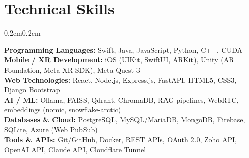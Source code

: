 \documentclass[9.5pt, letterpaper]{article}
\newenvironment{onecolentry}{
    \begin{adjustwidth}{0.2cm}{0.2cm}
}{
    \end{adjustwidth}
}
\begin{document}
\section{Technical Skills}
\begin{onecolentry}
\textbf{Programming Languages:} Swift, Java, JavaScript, Python, C++, CUDA \\
\textbf{Mobile / XR Development:} iOS (UIKit, SwiftUI, ARKit), Unity (AR Foundation, Meta XR SDK), Meta Quest 3 \\
\textbf{Web Technologies:} React, Node.js, Express.js, FastAPI, HTML5, CSS3, Django Bootstrap \\
\textbf{AI / ML:} Ollama, FAISS, Qdrant, ChromaDB, RAG pipelines, WebRTC, embeddings (nomic, snowflake-arctic) \\
\textbf{Databases \& Cloud:} PostgreSQL, MySQL/MariaDB, MongoDB, Firebase, SQLite, Azure (Web PubSub) \\
\textbf{Tools \& APIs:} Git/GitHub, Docker, REST APIs, OAuth 2.0, Zoho API, OpenAI API, Claude API, Cloudflare Tunnel
\end{onecolentry}
\end{document}
